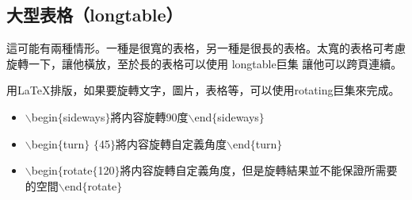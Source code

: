 \subsection{大型表格（longtable）}

這可能有兩種情形。一種是很寬的表格，另一種是很長的表格。太寬的表格可考慮旋轉一下，讓他橫放，至於長的表格可以使用 longtable巨集 讓他可以跨頁連續。

\bigskip

用\LaTeX 排版，如果要旋轉文字，圖片，表格等，可以使用rotating巨集來完成。\\

\bigskip
{} 
\begin{itemize}
\item $\backslash$begin$\lbrace$sideways$\rbrace$將内容旋轉90度$\backslash$end$\lbrace$sideways$\rbrace$
\item $\backslash$begin$\lbrace$turn$\rbrace$ $\lbrace$45$\rbrace$將内容旋轉自定義角度$\backslash$end$\lbrace$turn$\rbrace$
\item $\backslash$begin$\lbrace$rotate$\lbrace$120$\rbrace$將内容旋轉自定義角度，但是旋轉結果並不能保證所需要的空間$\backslash$end$\lbrace$rotate$\rbrace$\\
\end{itemize}

